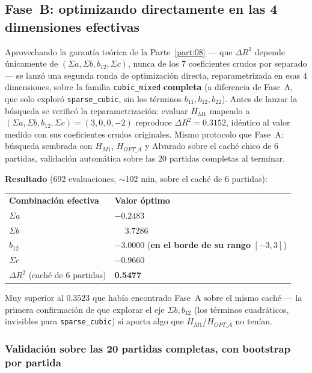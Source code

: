 \documentclass[11pt, a4paper]{article}
\newcommand{\TH}[1]{\cellcolor{cTHbg}\color{white}\textbf{#1}}
\newcommand{\good}[1]{\color{cGood}\textbf{#1}}
\newcommand{\bad}[1]{\color{cBad}\textbf{#1}}
\begin{document}
\subsection{Fase~B: optimizando directamente en las 4 dimensiones efectivas}
\label{sec:faseb}

Aprovechando la garant\'ia te\'orica de la Parte~\ref{part:08} --- que
$\Delta R^2$ depende \'unicamente de $(\Sigma a,\Sigma b,b_{12},\Sigma c)$,
nunca de los 7 coeficientes crudos por separado --- se lanz\'o una
segunda ronda de optimizaci\'on directa, reparametrizada en esas 4
dimensiones, sobre la familia \texttt{cubic\_mixed} \textbf{completa}
(a diferencia de Fase~A, que solo explor\'o \texttt{sparse\_cubic}, sin
los t\'erminos $b_{11},b_{12},b_{22}$). Antes de lanzar la b\'usqueda se
verific\'o la reparametrizaci\'on: evaluar $H_{M1}$ mapeado a
$(\Sigma a,\Sigma b,b_{12},\Sigma c)=(3,0,0,-2)$ reproduce
$\Delta R^2=0.3152$, id\'entico al valor medido con sus coeficientes
crudos originales. Mismo protocolo que Fase~A: b\'usqueda sembrada con
$H_{M1}$, $H_{OPT\_A}$ y Alvarado sobre el cach\'e chico de 6 partidas,
validaci\'on autom\'atica sobre las 20 partidas completas al terminar.

\textbf{Resultado} (692 evaluaciones, $\sim$102 min, sobre el cach\'e de
6 partidas):

\medskip
\begin{center}
\begin{tabular}{ll}
  \TH{Combinaci\'on efectiva} & \TH{Valor \'optimo} \\[1pt]
  $\Sigma a$ & $-0.2483$ \\
  $\Sigma b$ & $\phantom{-}3.7286$ \\
  $b_{12}$   & $-3.0000$ \small (\bad{en el borde de su rango} $[-3,3]$) \\
  $\Sigma c$ & $-0.9660$ \\
  $\Delta R^2$ (cach\'e de 6 partidas) & \good{0.5477} \\
\end{tabular}
\end{center}
\medskip

Muy superior al $0.3523$ que hab\'ia encontrado Fase~A sobre el mismo
cach\'e --- la primera confirmaci\'on de que explorar el eje
$\Sigma b, b_{12}$ (los t\'erminos cuadr\'aticos, invisibles para
\texttt{sparse\_cubic}) s\'i aporta algo que $H_{M1}$/$H_{OPT\_A}$ no
ten\'ian.

\subsubsection{Validaci\'on sobre las 20 partidas completas, con bootstrap por partida}
\end{document}
